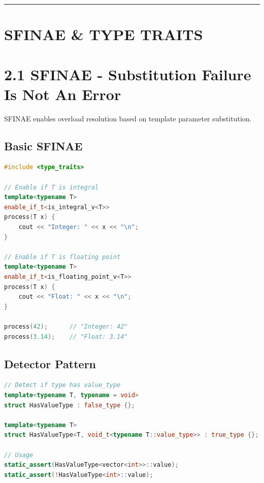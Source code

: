 \begin{center}\rule{0.5\linewidth}{0.5pt}\end{center}

\hypertarget{sfinae-type-traits}{%
\section{SFINAE \& TYPE TRAITS}\label{sfinae-type-traits}}

\hypertarget{sfinae---substitution-failure-is-not-an-error}{%
\section{2.1 SFINAE - Substitution Failure Is Not An
Error}\label{sfinae---substitution-failure-is-not-an-error}}

SFINAE enables overload resolution based on template parameter
substitution.

\hypertarget{basic-sfinae}{%
\subsection{Basic SFINAE}\label{basic-sfinae}}

\begin{lstlisting}[language={C++}]
#include <type_traits>

// Enable if T is integral
template<typename T>
enable_if_t<is_integral_v<T>>
process(T x) {
    cout << "Integer: " << x << "\n";
}

// Enable if T is floating point
template<typename T>
enable_if_t<is_floating_point_v<T>>
process(T x) {
    cout << "Float: " << x << "\n";
}

process(42);      // "Integer: 42"
process(3.14);    // "Float: 3.14"
\end{lstlisting}

\hypertarget{detector-pattern}{%
\subsection{Detector Pattern}\label{detector-pattern}}

\begin{lstlisting}[language={C++}]
// Detect if type has value_type
template<typename T, typename = void>
struct HasValueType : false_type {};

template<typename T>
struct HasValueType<T, void_t<typename T::value_type>> : true_type {};

// Usage
static_assert(HasValueType<vector<int>>::value);
static_assert(!HasValueType<int>::value);
\end{lstlisting}

